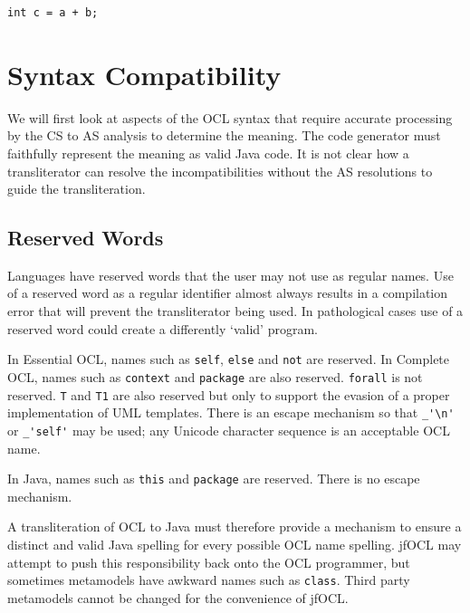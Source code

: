 \documentclass[sigconf]{acmart}
\begin{document}
\begin{verbatim}
int c = a + b;
\end{verbatim}


\section{Syntax Compatibility}\label{Syntax Compatibility}

We will first look at aspects of the OCL syntax that require accurate processing by the CS to AS analysis to determine the meaning. The code generator must faithfully represent the meaning as valid Java code. It is not clear how a transliterator can resolve the incompatibilities without the AS resolutions to guide the transliteration.

\subsection{Reserved Words}

Languages have reserved words that the user may not use as regular names. Use of a reserved word as a regular identifier almost always results in a compilation error that will prevent the transliterator being used. In pathological cases use of a reserved word could create a differently `valid' program.

In Essential OCL, names such as \verb|self|, \verb|else| and \verb|not| are reserved. In Complete OCL, names such as \verb|context| and \verb|package| are also reserved. \verb|forall| is not reserved. \verb|T| and \verb|T1| are also reserved but only to support the evasion of a proper implementation of UML templates. There is an escape mechanism so that \verb|_'\n'| or \verb|_'self'| may be used; any Unicode character sequence is an acceptable OCL name.

In Java, names such as \verb|this| and \verb|package| are reserved. There is no escape mechanism.

A transliteration of OCL to Java must therefore provide a mechanism to ensure a distinct and valid Java spelling for every possible OCL name spelling. jfOCL may attempt to push this responsibility back onto the OCL programmer, but sometimes metamodels have awkward names such as \verb|class|. Third party metamodels cannot be changed for the convenience of jfOCL.
\end{document}
